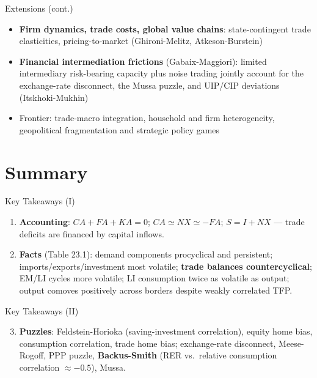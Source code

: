 \documentclass[blue]{beamer}
\begin{document}
\begin{frame}{Extensions (cont.)}
\begin{itemize}
    \item \textbf{Firm dynamics, trade costs, global value chains}: state-contingent trade elasticities, pricing-to-market (Ghironi-Melitz, Atkeson-Burstein)

    \item \textbf{Financial intermediation frictions} (Gabaix-Maggiori): limited intermediary risk-bearing capacity plus noise trading jointly account for the exchange-rate disconnect, the Mussa puzzle, and UIP/CIP deviations (Itskhoki-Mukhin)

    \item Frontier: trade-macro integration, household and firm heterogeneity, geopolitical fragmentation and strategic policy games
\end{itemize}
\end{frame}

\section{Summary}

\begin{frame}{Key Takeaways (I)}
\small
\begin{enumerate}
    \item \textbf{Accounting}: $CA + FA + KA = 0$; $CA \simeq NX \simeq -FA$; $S = I + NX$ --- trade deficits are financed by capital inflows.

    \item \textbf{Facts} (Table 23.1): demand components procyclical and persistent; imports/exports/investment most volatile; \textbf{trade balances countercyclical}; EM/LI cycles more volatile; LI consumption twice as volatile as output; output comoves positively across borders despite weakly correlated TFP.

\end{enumerate}
\end{frame}

\begin{frame}{Key Takeaways (II)}
\begin{enumerate}
    \setcounter{enumi}{2}
    \item \textbf{Puzzles}: Feldstein-Horioka (saving-investment correlation), equity home bias, consumption correlation, trade home bias; exchange-rate disconnect, Meese-Rogoff, PPP puzzle, \textbf{Backus-Smith} (RER vs.\ relative consumption correlation $\approx -0.5$), Mussa.

\end{enumerate}
\end{frame}
\end{document}
